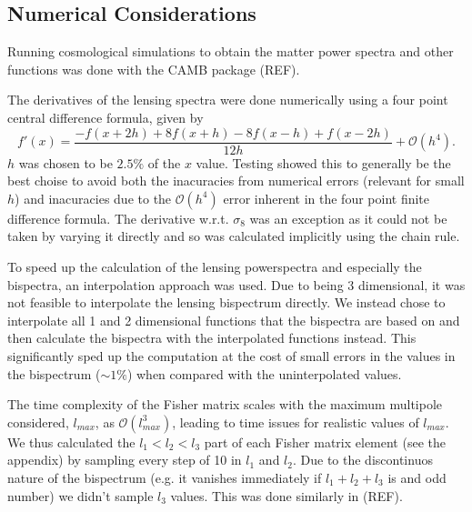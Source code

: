 \documentclass[11pt]{article} %
\begin{document}
\subsection{Numerical Considerations}

Running cosmological simulations to obtain the matter power spectra and other functions was done with the CAMB package (REF). 

The derivatives of the lensing spectra were done numerically using a four point central difference formula, given by
\begin{equation*}
    f'(x) = \frac{-f(x + 2h) + 8f(x+h) - 8 f(x - h) + f(x - 2h)}{12h} + \mathcal O (h^4).
\end{equation*}
$h$ was chosen to be $2.5\%$ of the $x$ value. Testing showed this to generally be the best choise to avoid both the inacuracies from numerical errors (relevant for small $h$) and inacuracies due to the $\mathcal O(h^4)$ error inherent in the four point finite difference formula. The derivative w.r.t. $\sigma_8$ was an exception as it could not be taken by varying it directly and so was calculated implicitly using the chain rule.

To speed up the calculation of the lensing powerspectra and especially the bispectra, an interpolation approach was used. Due to being 3 dimensional, it was not feasible to interpolate the lensing bispectrum directly. We instead chose to interpolate all 1 and 2 dimensional functions that the bispectra are based on and then calculate the bispectra with the interpolated functions instead. This significantly sped up the computation at the cost of small errors in the values in the bispectrum ($\sim 1\%$) when compared with the uninterpolated values.

The time complexity of the Fisher matrix scales with the maximum multipole considered, $l_{max}$, as $\mathcal O (l_{max}^3)$, leading to time issues for realistic values of $l_{max}$. We thus calculated the $l_1 < l_2 < l_3$ part of each Fisher matrix element (see the appendix) by sampling every step of 10 %
in $l_1$ and $l_2$. Due to the discontinuos nature of the bispectrum (e.g. it vanishes immediately if $l_1 + l_2 + l_3$ is and odd number) we didn't sample $l_3$ values. This was done similarly in (REF).
\end{document}
